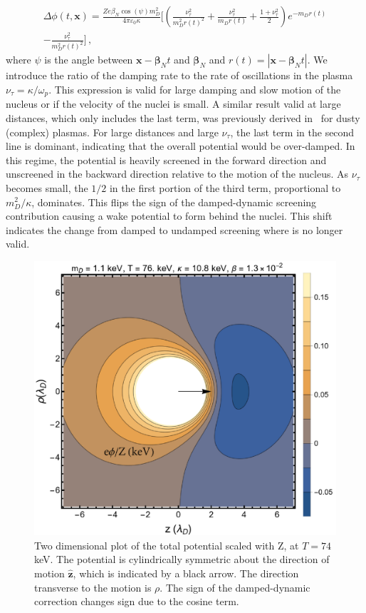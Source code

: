 \begin{multline}\label{eq:pos_point_DDS}
\Delta \phi(t,\boldsymbol{x}) = \frac{Ze \beta_N \cos (\psi) m_D^2}{4 \pi \varepsilon_0 \kappa} \Bigg[\left(\frac{\nu_\tau^2}{m_D^2 r(t)^2} + \frac{\nu_\tau^2}{m_D r(t)}+\frac{1 + \nu_\tau^2}{2}\right)e^{-m_D r(t)} \\ -\frac{\nu_\tau^2}{m_D^2 r(t)^2}\Bigg]\,,
\end{multline}
where $\psi$ is the angle between $\boldsymbol{x}-\boldsymbol{\beta}_N t$ and $\boldsymbol{\beta}_N$ and $r(t) = |\boldsymbol{x}-\boldsymbol{\beta}_N t|$.
We introduce the ratio of the damping rate to the rate of oscillations in the plasma $\nu_\tau = \kappa/\omega_p$.  This expression is valid for large damping and slow motion of the nucleus or if the velocity of the nuclei is small. A similar result valid at large distances, which only includes the last term, was previously derived in~\cite{Stenflo:1973} for dusty (complex) plasmas. For large distances and large $\nu_\tau$, the last term in the second line is dominant, indicating that the overall potential would be over-damped. In this regime, the potential is heavily screened in the forward direction and unscreened in the backward direction relative to the motion of the nucleus. As $\nu_\tau$ becomes small, the $1/2$ in the first portion of the third term, proportional to $m_D^2/\kappa$, dominates. This flips the sign of the damped-dynamic screening contribution causing a wake potential to form behind the nuclei. This shift indicates the change from damped to undamped screening where  is no longer valid. 

\begin{figure}[h!]
 \centering
 \includegraphics[width=.85\linewidth]{plots/chap03BBN/Pot_2DPlotFix.png}
 \caption{Two dimensional plot of the total potential  scaled with Z, at $T=74\,$keV. The potential is cylindrically symmetric about the direction of motion $\boldsymbol{\hat{z}}$, which is indicated by a black arrow. The direction transverse to the motion is $\rho$. The sign of the damped-dynamic correction  changes sign due to the cosine term.}
 \label{fig:numericalComp}
\end{figure} 

